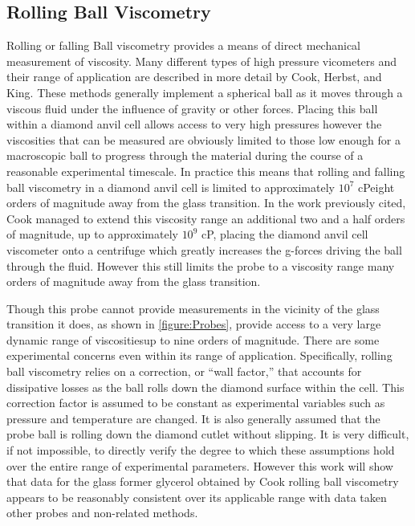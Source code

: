 \subsection{Rolling Ball Viscometry} \label{sec:rolling_ball}

Rolling or falling Ball viscometry provides a means of direct mechanical measurement of viscosity.  Many different types of high pressure vicometers and their range of application are described in more detail by Cook, Herbst, and King\cite{Cook}.  These methods generally implement a spherical ball as it moves through a viscous fluid under the influence of gravity or other forces.  Placing this ball within a diamond anvil cell allows access to very high pressures however the viscosities that can be measured are obviously limited to those low enough for a macroscopic ball to progress through the material during the course of a reasonable experimental timescale.  In practice this means that rolling and falling ball viscometry in a diamond anvil cell is limited to approximately $10^7$ cP\textemdash eight orders of magnitude away from the glass transition.  In the work previously cited, Cook \etal managed to extend this viscosity range an additional two and a half orders of magnitude, up to approximately $10^{9}$ cP, \via placing the diamond anvil cell viscometer onto a centrifuge which greatly increases the g-forces driving the ball through the fluid\cite{Cook}.  However this still limits the probe to a viscosity range many orders of magnitude away from the glass transition.

Though this probe cannot provide measurements in the vicinity of the glass transition it does, as shown in \fig \nolinebreak \ref{figure:Probes}, provide access to a very large dynamic range of viscosities\textemdash up to nine orders of magnitude.  There are some experimental concerns even within its range of application.  Specifically, rolling ball viscometry relies on a correction, or ``wall factor,'' that accounts for dissipative losses as the ball rolls down the diamond surface within the cell.  This correction factor is assumed to be constant as experimental variables such as pressure and temperature are changed.  It is also generally assumed that the probe ball is rolling down the diamond cutlet without slipping.  It is very difficult, if not impossible, to directly verify the degree to which these assumptions hold over the entire range of experimental parameters.  However this work will show that data for the glass former glycerol obtained by Cook \etal \via rolling ball viscometry appears to be reasonably consistent over its applicable range with data taken \via other probes and non-related methods.

